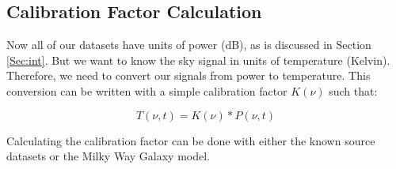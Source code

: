 \subsection{Calibration Factor Calculation}

Now all of our datasets have units of power (dB), as is discussed in Section \ref{Sec:int}. But we want to know the sky signal in units of temperature (Kelvin). Therefore, we need to convert our signals from power to temperature. This conversion can be written with a simple calibration factor $K(\nu)$ such that:

\begin{equation}
T(\nu,t) = K(\nu)*P(\nu,t)
\end{equation}

Calculating the calibration factor can be done with either the known source datasets or the Milky Way Galaxy model. 

